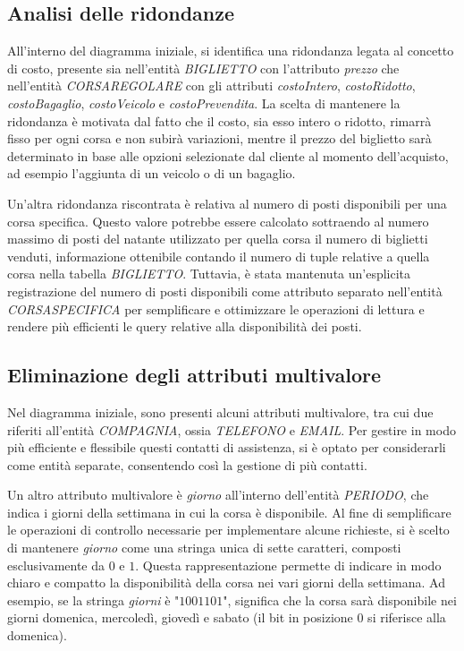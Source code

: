 \subsection{Analisi delle ridondanze}
All'interno del diagramma iniziale, si identifica una ridondanza legata al concetto di costo, presente sia nell'entità \textit{BIGLIETTO} con l'attributo \textit{prezzo} che nell'entità \textit{CORSAREGOLARE} con gli attributi \textit{costoIntero}, \textit{costoRidotto}, \textit{costoBagaglio}, \textit{costoVeicolo} e \textit{costoPrevendita}. La scelta di mantenere la ridondanza è motivata dal fatto che il costo, sia esso intero o ridotto, rimarrà fisso per ogni corsa e non subirà variazioni, mentre il prezzo del biglietto sarà determinato in base alle opzioni selezionate dal cliente al momento dell'acquisto, ad esempio l'aggiunta di un veicolo o di un bagaglio.

Un'altra ridondanza riscontrata è relativa al numero di posti disponibili per una corsa specifica. Questo valore potrebbe essere calcolato sottraendo al numero massimo di posti del natante utilizzato per quella corsa il numero di biglietti venduti, informazione ottenibile contando il numero di tuple relative a quella corsa nella tabella \textit{BIGLIETTO}. Tuttavia, è stata mantenuta un'esplicita registrazione del numero di posti disponibili come attributo separato nell'entità \textit{CORSASPECIFICA} per semplificare e ottimizzare le operazioni di lettura e rendere più efficienti le query relative alla disponibilità dei posti.

\subsection{Eliminazione degli attributi multivalore}
Nel diagramma iniziale, sono presenti alcuni attributi multivalore, tra cui due riferiti all'entità \textit{COMPAGNIA}, ossia \textit{TELEFONO} e \textit{EMAIL}. Per gestire in modo più efficiente e flessibile questi contatti di assistenza, si è optato per considerarli come entità separate, consentendo così la gestione di più contatti.

Un altro attributo multivalore è \textit{giorno} all'interno dell'entità \textit{PERIODO}, che indica i giorni della settimana in cui la corsa è disponibile. Al fine di semplificare le operazioni di controllo necessarie per implementare alcune richieste, si è scelto di mantenere \textit{giorno} come una stringa unica di sette caratteri, composti esclusivamente da $0$ e $1$. Questa rappresentazione permette di indicare in modo chiaro e compatto la disponibilità della corsa nei vari giorni della settimana. Ad esempio, se la stringa \textit{giorni} è "$1001101$", significa che la corsa sarà disponibile nei giorni domenica, mercoledì, giovedì e sabato (il bit in posizione 0 si riferisce alla domenica).

